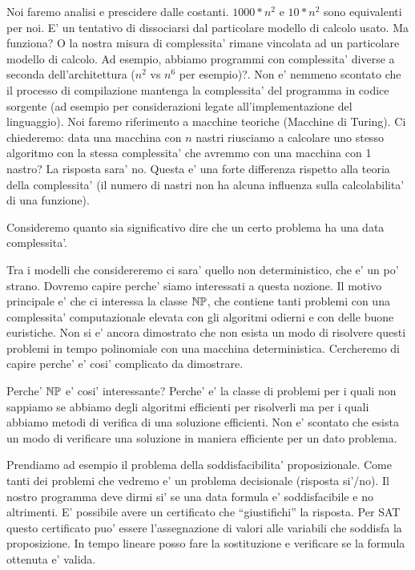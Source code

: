 Noi faremo analisi e prescidere dalle costanti. $1000*n^{2}$ e $10*n^{2}$ sono equivalenti per noi.
E' un tentativo di dissociarsi dal particolare modello di calcolo usato. Ma funziona? O la nostra
misura di complessita' rimane vincolata ad un particolare modello di calcolo. Ad esempio, abbiamo
programmi con complessita' diverse a seconda dell'architettura ($n^{2}$ vs $n^{6}$ per esempio)?.
Non e' nemmeno scontato che il processo di compilazione mantenga la complessita' del programma in
codice sorgente (ad esempio per considerazioni legate all'implementazione del linguaggio). Noi
faremo riferimento a macchine teoriche (Macchine di Turing). Ci chiederemo: data una macchina con
$n$ nastri riusciamo a calcolare uno stesso algoritmo con la stessa complessita' che avremmo con una
macchina con 1 nastro? La risposta sara' no. Questa e' una forte differenza rispetto alla teoria
della complessita' (il numero di nastri non ha alcuna influenza sulla calcolabilita' di una
funzione).

Consideremo quanto sia significativo dire che un certo problema ha una data complessita'.

Tra i modelli che considereremo ci sara' quello non deterministico, che e' un po' strano. Dovremo
capire perche' siamo interessati a questa nozione. Il motivo principale e' che ci interessa la
classe $\mathbb{NP}$, che contiene tanti problemi con una complessita' computazionale elevata con gli algoritmi
odierni e con delle buone euristiche. Non si e' ancora dimostrato che non esista un modo di
risolvere questi problemi in tempo polinomiale con una macchina deterministica. Cercheremo di capire
perche' e' cosi' complicato da dimostrare.

Perche' $\mathbb{NP}$ e' cosi' interessante? Perche' e' la classe di problemi per i quali non sappiamo se
abbiamo degli algoritmi efficienti per risolverli ma per i quali abbiamo metodi di verifica di una
soluzione efficienti. Non e' scontato che esista un modo di verificare una soluzione in maniera
efficiente per un dato problema.

Prendiamo ad esempio il problema della soddisfacibilita' proposizionale. Come tanti dei problemi che
vedremo e' un problema decisionale (risposta si'/no). Il nostro programma deve dirmi si' se una data
formula e' soddisfacibile e no altrimenti. E' possibile avere un certificato che ``giustifichi'' la
risposta. Per SAT questo certificato puo' essere l'assegnazione di valori alle variabili che
soddisfa la proposizione. In tempo lineare posso fare la sostituzione e verificare se la formula
ottenuta e' valida.

